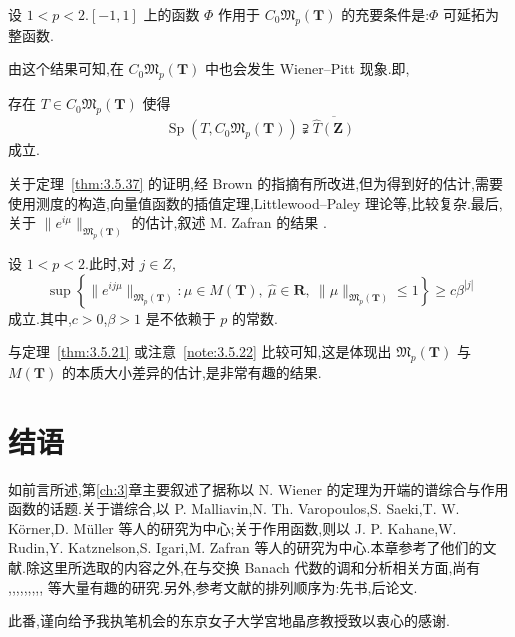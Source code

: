 \begin{theorem}\label{thm:3.5.37}
设 $1 < p < 2$.$[-1, 1]$ 上的函数 $\Phi$ 作用于 $C_{0}\mathfrak{M}_{p}(\mathbf{T})$ 的充要条件是:$\Phi$ 可延拓为整函数.
\end{theorem}

由这个结果可知,在 $C_0\mathfrak{M}_p(\mathbf{T})$ 中也会发生 Wiener--Pitt 现象.即,

\begin{corollary}\label{cor:3.5.38}
存在 $T \in C_{0}\mathfrak{M}_{p}(\mathbf{T})$ 使得
\begin{equation*}
\operatorname{Sp}\left(T, C_{0}\mathfrak{M}_{p}(\mathbf{T})\right) \supsetneqq \overline{\widehat{T}(\mathbf{Z})}
\end{equation*}
成立.
\end{corollary}

关于定理~\ref{thm:3.5.37} 的证明,经 Brown \cite{ch3:13} 的指摘有所改进,但为得到好的估计,需要使用测度的构造,向量值函数的插值定理,Littlewood--Paley 理论等,比较复杂.最后,关于 $\|e^{i\mu}\|_{\mathfrak{M}_{p}(\mathbf{T})}$ 的估计,叙述 M. Zafran 的结果 \cite{ch3:60}.

\begin{theorem}[Zafran]\label{thm:3.5.39}
设 $1 < p < 2$.此时,对 $j \in Z$,
\begin{equation*}
\sup\left\{\|e^{ij\mu}\|_{\mathfrak{M}_{p}(\mathbf{T})}: \mu \in M(\mathbf{T}),\ \hat{\mu} \in \mathbf{R},\ \|\mu\|_{\mathfrak{M}_{p}(\mathbf{T})} \leq 1\right\} \geq c\beta^{|j|}
\end{equation*}
成立.其中,$c>0$,$\beta>1$ 是不依赖于 $p$ 的常数.
\end{theorem}

与定理~\ref{thm:3.5.21} 或注意~\ref{note:3.5.22} 比较可知,这是体现出 $\mathfrak{M}_{p}(\mathbf{T})$ 与 $M(\mathbf{T})$ 的本质大小差异的估计,是非常有趣的结果.

\section*{结语}

如前言所述,第\ref{ch:3}章主要叙述了据称以 N. Wiener 的定理为开端的谱综合与作用函数的话题.关于谱综合,以 P. Malliavin,N. Th. Varopoulos,S. Saeki,T. W. Körner,D. Müller 等人的研究为中心;关于作用函数,则以 J. P. Kahane,W. Rudin,Y. Katznelson,S. Igari,M. Zafran 等人的研究为中心.本章参考了他们的文献.除这里所选取的内容之外,在与交换 Banach 代数的调和分析相关方面,尚有 \cite{ch3:6},\cite{ch3:15},\cite{ch3:21},\cite{ch3:25},\cite{ch3:30},\cite{ch3:36},\cite{ch3:37},\cite{ch3:38},\cite{ch3:46},\cite{ch3:58} 等大量有趣的研究.另外,参考文献的排列顺序为:先书,后论文.

此番,谨向给予我执笔机会的东京女子大学宮地晶彦教授致以衷心的感谢.
